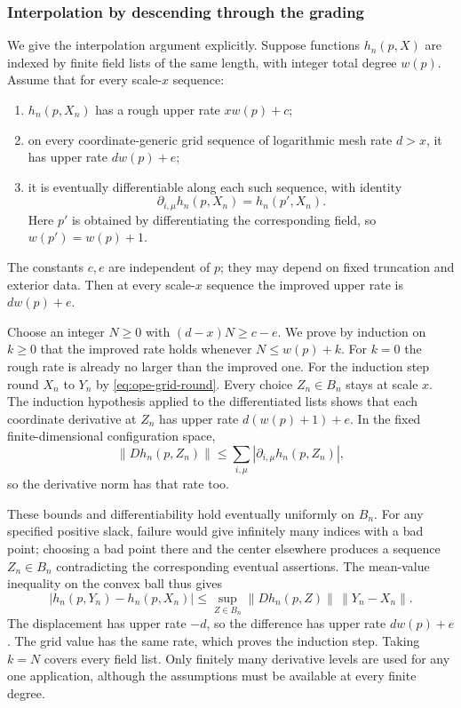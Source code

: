 \subsubsection{Interpolation by descending through the grading}
We give the interpolation argument explicitly. Suppose functions
$h_n(p,X)$ are indexed by finite field lists of the same length, with
integer total degree $w(p)$. Assume that for every scale-$x$ sequence:
\begin{enumerate}
\item $h_n(p,X_n)$ has a rough upper rate $xw(p)+c$;
\item on every coordinate-generic grid sequence of logarithmic mesh rate
$d>x$, it has upper rate $dw(p)+e$;
\item it is eventually differentiable along each such sequence, with identity
\[\partial_{i,\mu}h_n(p,X_n)=h_n(p',X_n).\]
Here $p'$ is obtained by differentiating the corresponding field, so
$w(p')=w(p)+1$.
\end{enumerate}
The constants $c,e$ are independent of $p$; they may depend on fixed
truncation and exterior data. Then at every scale-$x$ sequence the
improved upper rate is $dw(p)+e$.

Choose an integer $N\geq0$ with $(d-x)N\geq c-e$. We prove by induction
on $k\geq0$ that the improved rate holds whenever $N\leq w(p)+k$.
For $k=0$ the rough rate is already no larger than the improved one.
For the induction step round $X_n$ to $Y_n$ by
\eqref{eq:ope-grid-round}. Every choice $Z_n\in B_n$ stays at scale $x$.
The induction hypothesis applied to the differentiated lists shows that
each coordinate derivative at $Z_n$ has upper rate
$d(w(p)+1)+e$. In the fixed finite-dimensional configuration space,
\[
 \|Dh_n(p,Z_n)\|\leq\sum_{i,\mu}
                       |\partial_{i,\mu}h_n(p,Z_n)|,
\]
so the derivative norm has that rate too.

These bounds and differentiability hold eventually uniformly on $B_n$.
For any specified positive slack, failure would give infinitely many
indices with a bad point; choosing a bad point there and the center
elsewhere produces a sequence $Z_n\in B_n$ contradicting the corresponding
eventual assertions. The mean-value inequality on the convex ball thus
gives
\[
 |h_n(p,Y_n)-h_n(p,X_n)|
 \leq\sup_{Z\in B_n}\|Dh_n(p,Z)\|\,\|Y_n-X_n\|.
\]
The displacement has upper rate $-d$, so the difference has upper rate
$dw(p)+e$. The grid value has the same rate, which proves the induction
step. Taking $k=N$ covers every field list. Only finitely many derivative
levels are used for any one application, although the assumptions must be
available at every finite degree.

